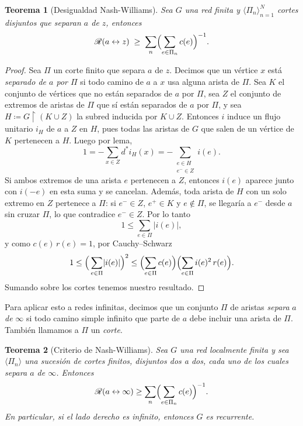 \documentclass[11pt,a4paper]{article}
\numberwithin{equation}{section}
\theoremstyle{LPplain}
\newtheorem{teo}{Teorema}[section]
\theoremstyle{LPdef}
\theoremstyle{LPrem}
\begin{document}
\begin{teo}[Desigualdad Nash-Williams]\label{teo:principal}
  Sea $G$ una red finita y $\langle \Pi_n\rangle_{n=1}^{N}$ cortes disjuntos que separan
  $a$ de $z$, entonces
  \[
    \mathscr{R}(a\leftrightarrow z) \;\ge\; \sum_n
    \Bigl(\sum_{e\in\Pi_n} c(e)\Bigr)^{-1}.
  \]
\end{teo}

\begin{proof}
  Sea $\Pi$ un corte finito que separa $a$ de $z$. Decimos que un vértice $x$
  está \textit{separado de $a$ por $\Pi$} si todo camino de $a$ a $x$ usa alguna
  arista de $\Pi$. Sea $K$ el conjunto de vértices que no están separados de $a$
  por $\Pi$, sea $Z$ el conjunto de extremos de aristas de $\Pi$ que sí están
  separados de $a$ por $\Pi$, y sea $H \coloneqq G \!\upharpoonright\! (K \cup Z)$
  la subred inducida por $K \cup Z$. Entonces $i$ induce un flujo unitario $i_H$
  de $a$ a $Z$ en $H$, pues todas las aristas de $G$ que salen de un vértice de
  $K$ pertenecen a $H$. Luego por lema,
  \[
    1 = -\sum_{x \in Z} d^{*}i_H(x)
      = -\sum_{\substack{e \in H \\ e^{-} \in Z}} i(e).
  \]
  Si ambos extremos de una arista $e$ pertenecen a $Z$, entonces $i(e)$ aparece
  junto con $i(-e)$ en esta suma y se cancelan. Además, toda arista de $H$ con un
  solo extremo en $Z$ pertenece a $\Pi$: si $e^{-} \in Z$, $e^{+} \in K$ y
  $e \notin \Pi$, se llegaría a $e^{-}$ desde $a$ sin cruzar $\Pi$, lo que
  contradice $e^{-} \in Z$. Por lo tanto
  \[
    1 \le \sum_{e \in \Pi} \lvert i(e) \rvert,
  \]
  y como $c(e)\, r(e) = 1$, por Cauchy--Schwarz
  \[
    1 \le \Big( \sum_{e \in \Pi} \lvert i(e) \rvert \Big)^2 
      \le \Bigl( \sum_{e \in \Pi} c(e) \Bigr)
          \Bigl( \sum_{e \in \Pi} i(e)^2\, r(e) \Bigr).
  \]
  Sumando sobre los cortes tenemos nuestro resultado.
\end{proof}
Para aplicar esto a redes infinitas, decimos que un conjunto $\Pi$ de aristas
\textit{separa} $a$ \textit{de} $\infty$ si todo camino simple infinito que
parte de $a$ debe incluir una arista de $\Pi$. También llamamos a $\Pi$ un
\textit{corte}.

\begin{teo}[Criterio de Nash-Williams]\label{thm:nash-williams-criterion}
  Sea $G$ una red localmente finita y sea $\langle \Pi_n \rangle$ una sucesión
  de cortes finitos, disjuntos dos a dos, cada uno de los cuales separa $a$ de
  $\infty$. Entonces
  \begin{equation}\label{eq:nash-williams-inf}
    \mathscr{R}(a \leftrightarrow \infty)
    \ge \sum_{n} \Bigl( \sum_{e \in \Pi_n} c(e) \Bigr)^{-1}.
  \end{equation}
  En particular, si el lado derecho es infinito, entonces $G$ es recurrente.
\end{teo}
\end{document}
